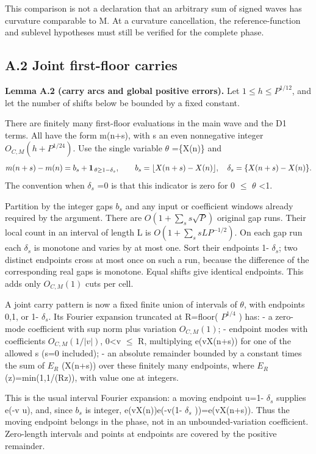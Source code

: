 \documentclass[11pt,a4paper]{article}
\begin{document}
This comparison is not a declaration that an arbitrary sum of signed
waves has curvature comparable to M. At a curvature cancellation, the
reference-function and sublevel hypotheses must still be verified for
the complete phase.


\subsection{A.2 Joint first-floor
carries}\label{a.2-joint-first-floor-carries}

\textbf{Lemma A.2 (carry arcs and global positive errors).} Let
\(1\le h\le P^{1/12}\), and let the number of shifts below be bounded by
a fixed constant.

There are finitely many first-floor evaluations in the main wave and the
D1 terms. All have the form m(n+s), with s an even nonnegative integer
\(O_{C,M}(h+P^{1/24})\). Use the single variable \(\theta\) =\{X(n)\}
and \[
m(n+s)-m(n)=b_s+
{\bf1}_{\,\theta\ge 1-\delta_s},\qquad
b_s=\lfloor X(n+s)-X(n)\rfloor,\quad
\delta_s=\{X(n+s)-X(n)\}.
\] The convention when \(\delta_s\) =0 is that this indicator is zero
for 0 \(\le\) \(\theta\) \textless1.

Partition by the integer gaps \(b_s\) and any input or coefficient
windows already required by the argument. There are
\(O(1+\sum_s s \sqrt{P})\) original gap runs. Their local count in an
interval of length L is \(O(1+\sum_s s L P^{-1/2})\). On each gap run
each \(\delta_s\) is monotone and varies by at most one. Sort their
endpoints 1- \(\delta_s\); two distinct endpoints cross at most once on
such a run, because the difference of the corresponding real gaps is
monotone. Equal shifts give identical endpoints. This adds only
\(O_{C,M}(1)\) cuts per cell.

A joint carry pattern is now a fixed finite union of intervals of
\(\theta\), with endpoints 0,1, or 1- \(\delta_s\). Its Fourier
expansion truncated at R=floor( \(P^{1/4}\) ) has: - a zero-mode
coefficient with sup norm plus variation \(O_{C,M}(1)\); - endpoint
modes with coefficients \(O_{C,M}(1/|v|)\),
0\textless\textbar v\textbar{} \(\le\) R, multiplying e(vX(n+s)) for one
of the allowed s (s=0 included); - an absolute remainder bounded by a
constant times the sum of \(E_R\) (X(n+s)) over these finitely many
endpoints, where \(E_R\)
(z)=min(1,1/(R\textbar\textbar z\textbar\textbar)), with value one at
integers.

This is the usual interval Fourier expansion: a moving endpoint u=1-
\(\delta_s\) supplies e(-v u), and, since \(b_s\) is integer,
e(vX(n))e(-v(1- \(\delta_s\) ))=e(vX(n+s)). Thus the moving endpoint
belongs in the phase, not in an unbounded-variation coefficient.
Zero-length intervals and points at endpoints are covered by the
positive remainder.
\end{document}
